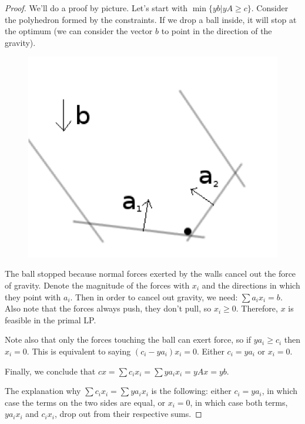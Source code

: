 \documentclass{article}
\begin{document}
\begin{proof}
We'll do a proof by picture.
Let's start with $\min \{yb | yA \ge c\}$.
Consider the polyhedron formed by the constraints.
If we drop a ball inside, it will stop at the optimum (we can consider the vector $b$ to point in the direction of the gravity).

\begin{figure}[h]
\begin{center}
  \includegraphics{gravity_ball.png}
  \label{fig:gravity-ball}
\end{center}
\end{figure}

The ball stopped because normal forces exerted by the walls cancel out the force of gravity. Denote the magnitude of the forces with $x_i$ and the directions in which they point with $a_i$. Then in order to cancel out gravity, we need: $\sum a_i x_i = b$. Also note that the forces always push, they don't pull, so $x_i \ge 0$.
Therefore, $x$ is feasible in the primal LP.

Note also that only the forces touching the ball can exert force, so if $y a_i \ge c_i$ then $x_i = 0$. This is equivalent to saying $(c_i - y a_i) x_i = 0$. Either $c_i = y a_i$ or $x_i = 0$.

Finally, we conclude that
$cx = \sum c_i x_i = \sum y a_i x_i = yAx = yb$.

The explanation why $\sum c_i x_i = \sum y a_i x_i$ is the following: either $c_i = y a_i$, in which case the terms on the two sides are equal, or $x_i=0$, in which case both terms, $y a_i x_i $ and $c_i x_i$, drop out from their respective sums.

\end{proof}
\end{document}
